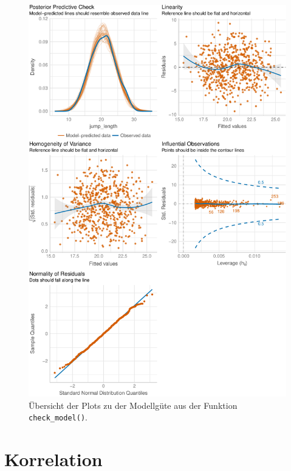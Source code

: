 \documentclass[
  letterpaper,
]{scrbook}
\begin{document}
\begin{figure}[H]

{\centering \includegraphics{./stat-linear-reg-quality_files/figure-pdf/fig-scatter-qual-04-1.pdf}

}

\caption{\label{fig-scatter-qual-04}Übersicht der Plots zu der
Modellgüte aus der Funktion \texttt{check\_model()}.}

\end{figure}

\hypertarget{sec-lin-reg-corr}{%
\chapter{Korrelation}\label{sec-lin-reg-corr}}
\end{document}
